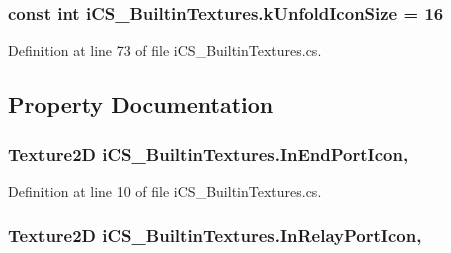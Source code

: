 \hypertarget{classi_c_s___builtin_textures_a4c241ed093f39308fc1e58e9d23e51ee}{
\subsubsection[{k\+Unfold\+Icon\+Size}]{\setlength{\rightskip}{0pt plus 5cm}const int i\+C\+S\+\_\+\+Builtin\+Textures.\+k\+Unfold\+Icon\+Size = 16}}\label{classi_c_s___builtin_textures_a4c241ed093f39308fc1e58e9d23e51ee}


Definition at line 73 of file i\+C\+S\+\_\+\+Builtin\+Textures.\+cs.



\subsection{Property Documentation}
\hypertarget{classi_c_s___builtin_textures_a227fb7d2d724d7bdcb4554dc76229c8b}{
\subsubsection[{In\+End\+Port\+Icon}]{\setlength{\rightskip}{0pt plus 5cm}Texture2\+D i\+C\+S\+\_\+\+Builtin\+Textures.\+In\+End\+Port\+Icon\hspace{0.3cm}{\ttfamily [static]}, {\ttfamily [get]}}}\label{classi_c_s___builtin_textures_a227fb7d2d724d7bdcb4554dc76229c8b}


Definition at line 10 of file i\+C\+S\+\_\+\+Builtin\+Textures.\+cs.

\hypertarget{classi_c_s___builtin_textures_a54a50ba9927b768c1dfd3c6316bafa8d}{
\subsubsection[{In\+Relay\+Port\+Icon}]{\setlength{\rightskip}{0pt plus 5cm}Texture2\+D i\+C\+S\+\_\+\+Builtin\+Textures.\+In\+Relay\+Port\+Icon\hspace{0.3cm}{\ttfamily [static]}, {\ttfamily [get]}}}\label{classi_c_s___builtin_textures_a54a50ba9927b768c1dfd3c6316bafa8d}


